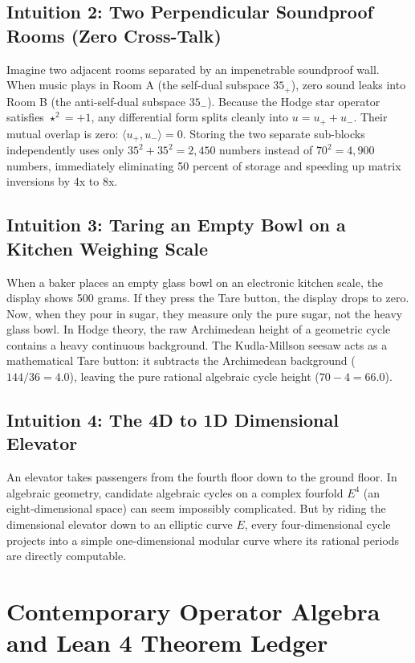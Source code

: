 \documentclass[11pt,a4paper]{article}
\begin{document}
\subsection{Intuition 2: Two Perpendicular Soundproof Rooms (Zero Cross-Talk)}
Imagine two adjacent rooms separated by an impenetrable soundproof wall. When music plays in Room A (the self-dual subspace $35_+$), zero sound leaks into Room B (the anti-self-dual subspace $35_-$). Because the Hodge star operator satisfies $\star^2 = +1$, any differential form splits cleanly into $u = u_+ + u_-$. Their mutual overlap is zero: $\langle u_+, u_-\rangle = 0$. Storing the two separate sub-blocks independently uses only $35^2 + 35^2 = 2,450$ numbers instead of $70^2 = 4,900$ numbers, immediately eliminating 50 percent of storage and speeding up matrix inversions by 4x to 8x.

\subsection{Intuition 3: Taring an Empty Bowl on a Kitchen Weighing Scale}
When a baker places an empty glass bowl on an electronic kitchen scale, the display shows 500 grams. If they press the Tare button, the display drops to zero. Now, when they pour in sugar, they measure only the pure sugar, not the heavy glass bowl. In Hodge theory, the raw Archimedean height of a geometric cycle contains a heavy continuous background. The Kudla-Millson seesaw acts as a mathematical Tare button: it subtracts the Archimedean background ($144/36 = 4.0$), leaving the pure rational algebraic cycle height ($70 - 4 = 66.0$).

\subsection{Intuition 4: The 4D to 1D Dimensional Elevator}
An elevator takes passengers from the fourth floor down to the ground floor. In algebraic geometry, candidate algebraic cycles on a complex fourfold $E^4$ (an eight-dimensional space) can seem impossibly complicated. But by riding the dimensional elevator down to an elliptic curve $E$, every four-dimensional cycle projects into a simple one-dimensional modular curve where its rational periods are directly computable.

\section{Contemporary Operator Algebra and Lean 4 Theorem Ledger}
\end{document}
